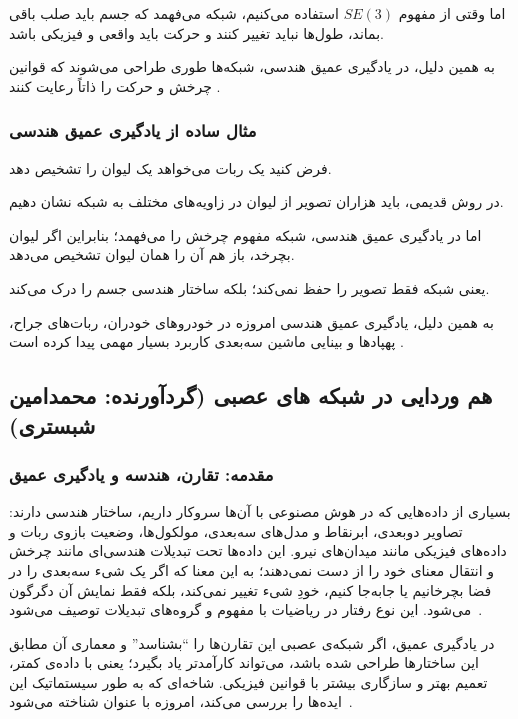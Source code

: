 \documentclass{article}
\begin{document}
اما وقتی از مفهوم $SE(3)$ استفاده می‌کنیم، شبکه می‌فهمد که جسم باید صلب باقی بماند، طول‌ها نباید تغییر کنند و حرکت باید واقعی و فیزیکی باشد.

به همین دلیل، در یادگیری عمیق هندسی، شبکه‌ها طوری طراحی می‌شوند که قوانین چرخش و حرکت را ذاتاً رعایت کنند \cite{cohen2016group}.

\subsubsection{مثال ساده از یادگیری عمیق هندسی}

فرض کنید یک ربات می‌خواهد یک لیوان را تشخیص دهد.

در روش قدیمی، باید هزاران تصویر از لیوان در زاویه‌های مختلف به شبکه نشان دهیم.

اما در یادگیری عمیق هندسی، شبکه مفهوم چرخش را می‌فهمد؛ بنابراین اگر لیوان بچرخد، باز هم آن را همان لیوان تشخیص می‌دهد.

یعنی شبکه فقط تصویر را حفظ نمی‌کند؛ بلکه ساختار هندسی جسم را درک می‌کند.

به همین دلیل، یادگیری عمیق هندسی امروزه در خودروهای خودران، ربات‌های جراح، پهپادها و بینایی ماشین سه‌بعدی کاربرد بسیار مهمی پیدا کرده است \cite{thomas2018tensor}.

\subsection{هم وردایی در شبکه های عصبی (گردآورنده: محمدامین شبستری)}

\subsubsection{مقدمه: تقارن، هندسه و یادگیری عمیق}

بسیاری از داده‌هایی که در هوش مصنوعی با آن‌ها سروکار داریم، ساختار هندسی دارند: تصاویر دوبعدی، ابرنقاط و مدل‌های سه‌بعدی، مولکول‌ها، وضعیت بازوی ربات و داده‌های فیزیکی مانند میدان‌های نیرو. این داده‌ها تحت تبدیلات هندسی‌ای مانند چرخش و انتقال معنای خود را از دست نمی‌دهند؛ به این معنا که اگر یک شیء سه‌بعدی را در فضا بچرخانیم یا جابه‌جا کنیم، خودِ شیء تغییر نمی‌کند، بلکه فقط نمایش آن دگرگون می‌شود. این نوع رفتار در ریاضیات با مفهوم  و گروه‌های تبدیلات توصیف می‌شود~\cite{bronstein2021geometric}.

در یادگیری عمیق، اگر شبکه‌ی عصبی این تقارن‌ها را ``بشناسد'' و معماری آن مطابق این ساختارها طراحی شده باشد، می‌تواند کارآمدتر یاد بگیرد؛ یعنی با داده‌ی کمتر، تعمیم بهتر و سازگاری بیشتر با قوانین فیزیکی. شاخه‌ای که به طور سیستماتیک این ایده‌ها را بررسی می‌کند، امروزه با عنوان  شناخته می‌شود~\cite{bronstein2021geometric}.
\end{document}
